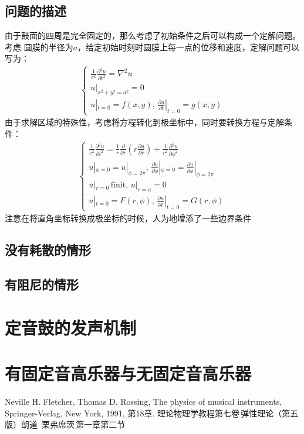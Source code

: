 \documentclass[a4paper]{ctexart}
\newcommand{\mr}[1]{\mathrm{#1}}
\newcommand{\pdv}[2]{\frac{\partial{#1}}{\partial{#2}}}
\begin{document}
	\subsection{问题的描述}
	由于鼓面的四周是完全固定的，那么考虑了初始条件之后可以构成一个定解问题。考虑
	圆膜的半径为$a$，给定初始时刻时圆膜上每一点的位移和速度，定解问题可以写为：
	\begin{align}
		\left\{
			\begin{array}{lr}
				\frac{1}{c^2}\pdv{^{2}u}{t^2} = \nabla^{2}u\\
				u|_{x^2 + y^2 = a^2} = 0\\
				u|_{t=0} = f(x, y),\, \pdv{u}{t}|_{t=0} = g(x, y)
			\end{array}
		\right.
	\end{align}
	由于求解区域的特殊性，考虑将方程转化到极坐标中，同时要转换方程与定解条件：
	\begin{align}
		\left\{
			\begin{array}{lr}
				\frac{1}{c^2}\pdv{^{2}u}{t^2} = \frac{1}{r}\pdv{}{r}\left(r\pdv{u}{r}\right) + \frac{1}{r^2}\pdv{^2 u}{\phi^{2}}\\
				u|_{\phi=0} = u|_{\phi=2\pi},\, \pdv{u}{\phi}|_{\phi=0} = \pdv{u}{\phi}|_{\phi=2\pi}\\
				u|_{r=0}\,\mr{finit},\, u|_{r=a}=0\\
				u|_{t=0} = F(r, \phi),\, \pdv{u}{t}|_{t=0} = G(r, \phi)
			\end{array}
		\right.
	\end{align}
	注意在将直角坐标转换成极坐标的时候，人为地增添了一些边界条件
	\subsection{没有耗散的情形}
	\subsection{有阻尼的情形}
	\section{定音鼓的发声机制}
	\section{有固定音高乐器与无固定音高乐器}
	\begin{thebibliography}{99}
		Neville H. Fletcher, Thomas D. Rossing, The physics of musical instruments, Springer-Verlag, New York, 1991, 第18章.
		理论物理学教程第七卷\,弹性理论（第五版）朗道\, 栗弗席茨\,第一章第二节
	\end{thebibliography}
\end{document}
